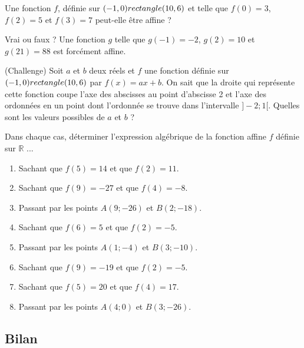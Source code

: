 {\begin{Exercice}
\end{Exercice}





\begin{Exercice} %
Une fonction $ f $, définie sur $ (-1,0) rectangle (10,6) $ et telle que $f(0)=3$, $f(2)=5$ et $f(3)=7$ peut-elle être affine ?
\end{Exercice}

\begin{Exercice} %
Vrai ou faux ? Une fonction $g$ telle que $g(-1) = -2$, $g(2) = 10$ et $g(21) = 88$ est forcément affine.
\end{Exercice}

\begin{Exercice} %
(Challenge) Soit $a$ et $b$ deux réels et $f$ une fonction définie sur $(-1,0) rectangle (10,6)$ par $f (x) = ax + b$. On sait que la droite qui représente cette fonction coupe l'axe des abscisses au point d'abscisse 2 et l'axe des ordonnées en un point dont l'ordonnée se trouve dans
l'intervalle $] - 2; 1[$. Quelles sont les valeurs possibles de $a$ et $b$ ?
\end{Exercice}


\begin{Exercice} %
Dans chaque cas, déterminer l'expression algébrique de la fonction affine $f$ définie sur $\mathbb R$ ...
\begin{enumerate}[itemsep=0.5em]
	\item Sachant que $f(5)=14$ et que $f(2)=11$. 
	\item Sachant que $f(9)=-27$ et que $f(4)=-8$.
	\item Passant par les points $A(9;-26)$ et $B(2;-18)$.
	\item Sachant que $f(6)=5$ et que $f(2)=-5$.
	\item Passant par les points $A(1;-4)$ et $B(3;-10)$.
	\item Sachant que $f(9)=-19$ et que $f(2)=-5$.
	\item Sachant que $f(5)=20$ et que $f(4)=17$.
	\item Passant par les points $A(4;0)$ et $B(3;-26)$.
\end{enumerate}
\end{Exercice}

\newpage

\subsection*{Bilan}

}
